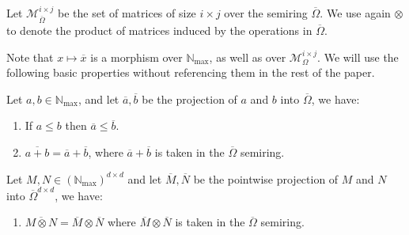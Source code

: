 \documentclass{lmcs}
\theoremstyle{remark}
\newcommand{\N}{\mathbb{N}}
\newcommand{\Nmax}{\N_{\max}}
\newcommand{\matricesOm}[2]{\mathcal{M}^{#1 \times #2}_\Omega}
\newcommand{\matricesOmbar}[2]{\mathcal{M}_{\overline{\Omega}}^{#1\times #2}}
\theoremstyle{remark}
\begin{document}
Let $\matricesOmbar{i}{j}$ be the set of matrices of size $i \times j$ over the semiring $\overline{\Omega}$. We use again $\otimes$ to denote the product of matrices induced by the operations in $\overline{\Omega}$.

Note that $x \mapsto \overline{x}$ is a morphism over $\Nmax$, as well as over $\matricesOm{i}{j}$. We will use the following basic properties without referencing them in the rest of the paper.

\begin{lem}\hfill
\label{lemma:propertyofbar}

\noindent Let $a,b\in \Nmax$, and let $\overline{a},\overline{b}$ be the projection of $a$ and $b$ into $\overline{\Omega}$, we have:
\begin{enumerate}[label={\normalfont(\arabic*)}]
\item If $a\le b$ then $\overline{a}\le \overline{b}$.
\item $\overline{a + b} = \overline{a} + \overline{b}$, where $\overline{a}+\overline{b}$ is taken  in the $\overline{\Omega}$ semiring.
\end{enumerate}
Let $M,N\in (\Nmax)^{d\times d}$ and let $\overline{M},\overline{N}$ be the pointwise projection of $M$ and $N$ into $\overline{\Omega}^{d\times d}$, we have:
\begin{enumerate}[resume,label={\normalfont(\arabic*)}]
\item $\overline{M\otimes N} = \overline{M}\otimes\overline{N}$ where $\overline{M}\otimes\overline{N}$ is taken  in the $\overline{\Omega}$ semiring.
\end{enumerate}
\end{lem}
\end{document}
